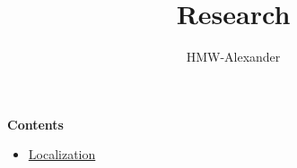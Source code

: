 \documentclass[letterpaper,11pt]{article}
\title{\textbf{Research}}
\author{HMW-Alexander}
\begin{document}
\maketitle

\textbf{Contents}
\begin{itemize}
	\item \href{./Localization/index.html}{Localization}
\end{itemize}
	
\end{document}
